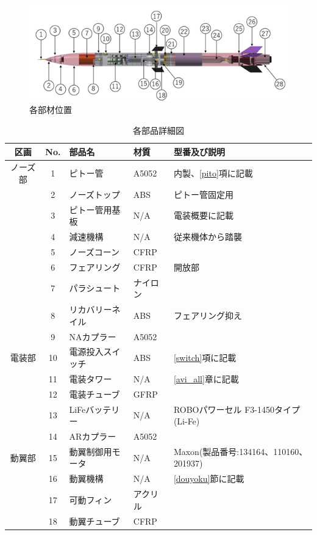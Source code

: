 \documentclass[a4paper,11pt,titlepage,uplatex]{jsarticle}
\begin{document}
\begin{figure}[H]
    \centering
    \includegraphics{pic_str/s_iti.png}
    \caption{各部材位置}
    \label{s_iti}
\end{figure} 

\renewcommand{\arraystretch}{0.9}
\begin{longtable}[H]{cclll} 
    \caption{各部品詳細図}
    \label{s_buhin}\\
        \toprule
        区画&No.&部品名&材質&型番及び説明\\ \hline \endhead
        ノーズ部&1&ピトー管&A5052&内製、\ref{pito}項に記載\\
         &2&ノーズトップ&ABS&ピトー管固定用\\
         &3&ピトー管用基板&N/A&電装概要に記載\\
         &4&減速機構&N/A&従来機体から踏襲\\
         &5&ノーズコーン&CFRP&\\
         &6&フェアリング&CFRP&開放部\\
         &7&パラシュート&ナイロン&\\
         &8&リカバリーネイル&ABS&フェアリング抑え\\\midrule
         &9&NAカプラー&A5052&\\ \midrule
        電装部&10&電源投入スイッチ&ABS&\ref{switch}項に記載\\
         &11&電装タワー&N/A&\ref{avi_all}章に記載\\
         &12&電装チューブ&GFRP&\\
         &13&LiFeバッテリー&N/A&ROBOパワーセル F3-1450タイプ(Li-Fe)\\ \midrule
         &14&ARカプラー&A5052&\\ \midrule
        動翼部&15&動翼制御用モータ&N/A&Maxon(製品番号:134164、110160、201937)\\
         &16&動翼機構&N/A&\ref{douyoku}節に記載\\
         &17&可動フィン&アクリル&\\
         &18&動翼チューブ&CFRP\\

\end{longtable}
\end{document}
